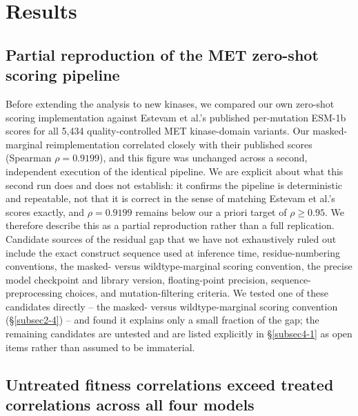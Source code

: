 \documentclass[pdflatex,sn-mathphys-num]{sn-jnl}%
\theoremstyle{thmstyleone}%
\theoremstyle{thmstyletwo}%
\theoremstyle{thmstylethree}%
\begin{document}
\section{Results}\label{sec2}

\subsection{Partial reproduction of the MET zero-shot scoring pipeline}\label{subsec2-1}

Before extending the analysis to new kinases, we compared our own zero-shot scoring implementation against Estevam et al.'s published per-mutation ESM-1b scores for all 5{,}434 quality-controlled MET kinase-domain variants. Our masked-marginal reimplementation correlated closely with their published scores (Spearman $\rho = 0.9199$), and this figure was unchanged across a second, independent execution of the identical pipeline. We are explicit about what this second run does and does not establish: it confirms the pipeline is deterministic and repeatable, not that it is correct in the sense of matching Estevam et al.'s scores exactly, and $\rho = 0.9199$ remains below our a priori target of $\rho \geq 0.95$. We therefore describe this as a partial reproduction rather than a full replication. Candidate sources of the residual gap that we have not exhaustively ruled out include the exact construct sequence used at inference time, residue-numbering conventions, the masked- versus wildtype-marginal scoring convention, the precise model checkpoint and library version, floating-point precision, sequence-preprocessing choices, and mutation-filtering criteria. We tested one of these candidates directly -- the masked- versus wildtype-marginal scoring convention (\S\ref{subsec2-4}) -- and found it explains only a small fraction of the gap; the remaining candidates are untested and are listed explicitly in \S\ref{subsec4-1} as open items rather than assumed to be immaterial.

\subsection{Untreated fitness correlations exceed treated correlations across all four models}\label{subsec2-1b}
\end{document}

